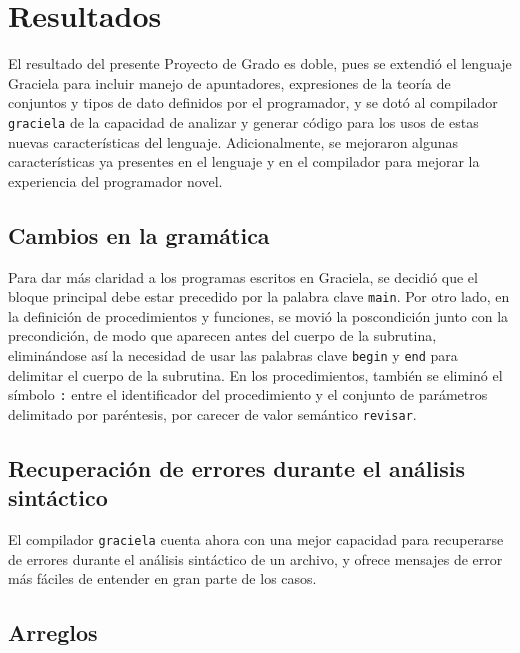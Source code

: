 \chapter{Resultados}
\label{capitulo4}

El resultado del presente Proyecto de Grado es doble, pues se extendió el
lenguaje Graciela para incluir manejo de apuntadores, expresiones de la teoría
de conjuntos y tipos de dato definidos por el programador, y se dotó al
compilador \texttt{graciela} de la capacidad de analizar y generar código para
los usos de estas nuevas características del lenguaje. Adicionalmente, se
mejoraron algunas características ya presentes en el lenguaje y en el compilador
para mejorar la experiencia del programador novel.


\section{Cambios en la gramática}

Para dar más claridad a los programas escritos en Graciela, se decidió que el
bloque principal debe estar precedido por la palabra clave \texttt{main}.  Por
otro lado, en la definición de procedimientos y funciones, se movió la
poscondición junto con la precondición, de modo que aparecen antes del cuerpo de
la subrutina, eliminándose así la necesidad de usar las palabras clave
\texttt{begin} y \texttt{end} para delimitar el cuerpo de la subrutina. En los
procedimientos, también se eliminó el  símbolo \texttt{:} entre el identificador
del procedimiento y el conjunto de parámetros delimitado por paréntesis, por
carecer de valor semántico \texttt{revisar}.

\section{Recuperación de errores durante el análisis sintáctico}

El compilador \texttt{graciela} cuenta ahora con una mejor capacidad para
recuperarse de errores durante el análisis sintáctico de un archivo, y ofrece
mensajes de error más fáciles de entender en gran parte de los casos.

\section{Arreglos}

